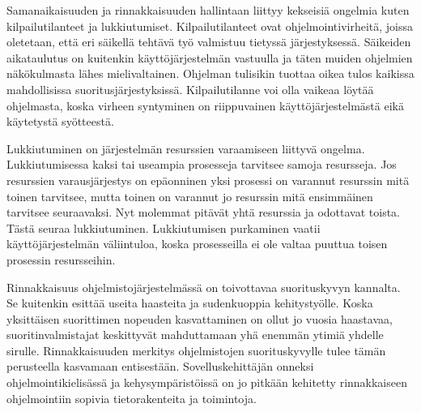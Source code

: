 \documentclass[a4paper, 12pt]{article}
\begin{document}

Samanaikaisuuden ja rinnakkaisuuden hallintaan liittyy kekseisiä ongelmia
kuten kilpailutilanteet ja lukkiutumiset.
Kilpailutilanteet ovat ohjelmointivirheitä,
joissa oletetaan, että eri säikellä tehtävä työ
valmistuu tietyssä järjestyksessä. Säikeiden
aikataulutus on kuitenkin käyttöjärjestelmän vastuulla
ja täten muiden ohjelmien näkökulmasta lähes mielivaltainen.
Ohjelman tulisikin tuottaa oikea tulos
kaikissa mahdollisissa suoritusjärjestyksissä.
Kilpailutilanne voi olla vaikeaa löytää
ohjelmasta, koska virheen syntyminen
on riippuvainen käyttöjärjestelmästä eikä käytetystä syötteestä.


Lukkiutuminen on järjestelmän resurssien varaamiseen liittyvä
ongelma. Lukkiutumisessa kaksi tai useampia prosesseja
tarvitsee samoja resursseja. Jos resurssien varausjärjestys
on epäonninen yksi prosessi on varannut resurssin mitä toinen
tarvitsee, mutta toinen on varannut jo resurssin mitä ensimmäinen
tarvitsee seuraavaksi. Nyt molemmat pitävät yhtä resurssia ja odottavat toista.
Tästä seuraa lukkiutuminen.
Lukkiutumisen purkaminen vaatii käyttöjärjestelmän väliintuloa,
koska prosesseilla ei ole valtaa puuttua toisen prosessin resursseihin.

Rinnakkaisuus ohjelmistojärjestelmässä on 
toivottavaa suorituskyvyn kannalta.
Se kuitenkin esittää useita haasteita
ja sudenkuoppia kehitystyölle.
Koska yksittäisen suorittimen nopeuden kasvattaminen
on ollut jo vuosia
haastavaa, suoritinvalmistajat keskittyvät mahduttamaan
yhä enemmän ytimiä yhdelle sirulle. Rinnakkaisuuden merkitys
ohjelmistojen suorituskyvylle tulee tämän perusteella kasvamaan entisestään.
Sovelluskehittäjän onneksi ohjelmointikielisässä ja kehysympäristöissä
on jo pitkään kehitetty rinnakkaiseen ohjelmointiin
sopivia tietorakenteita ja toimintoja.
\end{document}
